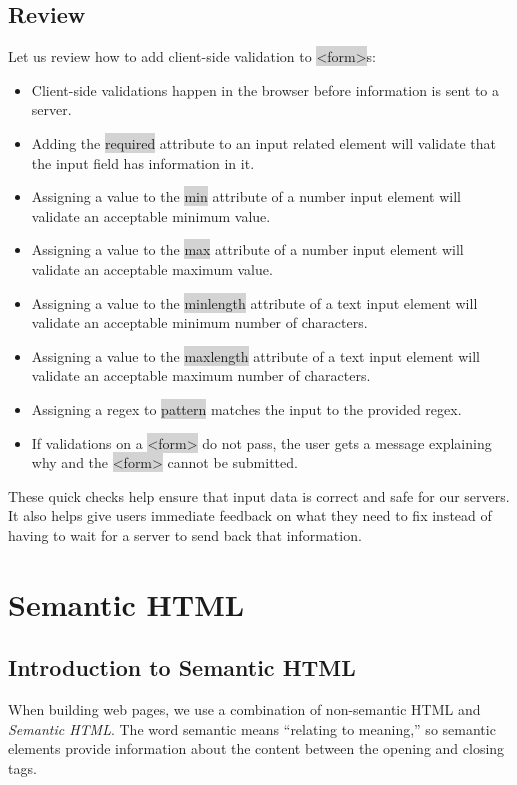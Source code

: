 \documentclass[11pt]{article}
\begin{document}
\subsection{Review}
Let us review how to add client-side validation to \colorbox{lightgray}{<form>}s: 
\begin{itemize}[leftmargin = *]
\item Client-side validations happen in the browser before information is sent to a server.
\item Adding the \colorbox{lightgray}{required} attribute to an input related element will validate that the input field has information in it.
\item Assigning a value to the \colorbox{lightgray}{min} attribute of a number input element will validate an acceptable minimum value.
\item Assigning a value to the \colorbox{lightgray}{max} attribute of a number input element will validate an acceptable maximum value.
\item Assigning a value to the \colorbox{lightgray}{minlength} attribute of a text input element will validate an acceptable minimum number of characters.
\item Assigning a value to the \colorbox{lightgray}{maxlength} attribute of a text input element will validate an acceptable maximum number of characters.
\item Assigning a regex to \colorbox{lightgray}{pattern} matches the input to the provided regex.
\item If validations on a \colorbox{lightgray}{<form>} do not pass, the user gets a message explaining why and the \colorbox{lightgray}{<form>} cannot be submitted.
\end{itemize}
These quick checks help ensure that input data is correct and safe for our servers. It also helps give users immediate feedback on what they need to fix instead of having to wait for a server to send back that information.

\newpage
\section{Semantic HTML}
\subsection{Introduction to Semantic HTML}
When building web pages, we use a combination of non-semantic HTML and \textit{Semantic HTML}. The word semantic means “relating to meaning,” so semantic elements provide information about the content between the opening and closing tags.
\end{document}
